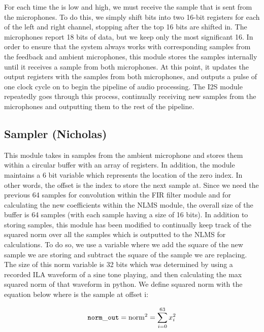 \documentclass{fpgairpods}
\begin{document}
For each time the  is low and high, we must receive the sample that is sent from the microphones. To do this, we simply shift bits into two 16-bit registers for each of the left and right channel, stopping after the top 16 bits are shifted in. The microphones report 18 bits of data, but we keep only the most significant 16. In order to ensure that the system always works with corresponding samples from the feedback and ambient microphones, this module stores the samples internally until it receives a sample from both microphones. At this point, it updates the output registers with the samples from both microphones, and outputs a pulse of one clock cycle on  to begin the pipeline of audio processing. The I2S module repeatedly goes through this process, continually receiving new samples from the microphones and outputting them to the rest of the pipeline.

\subsection{Sampler (Nicholas)}
This module takes in samples from the ambient microphone and stores them within a circular buffer with an array of registers. In addition, the module maintains a 6 bit  variable which represents the location of the zero index. In other words, the offset is the index to store the next sample at. Since we need the previous 64 samples for convolution within the FIR filter module and for calculating the new coefficients within the NLMS module, the overall size of the buffer is 64 samples (with each sample having a size of 16 bits). In addition to storing samples, this module has been modified to continually keep track of the squared norm over all the samples which is outputted to the NLMS for calculations. To do so, we use a  variable where we add the square of the new sample we are storing and subtract the square of the sample we are replacing. The size of this norm variable is 32 bits which was determined by using a recorded ILA waveform of a sine tone playing, and then calculating the max squared norm of that waveform in python. We define squared norm with the equation below where  is the sample at offset i:

$$\ttt{norm_out} = \text{norm}^2 = \sum_{i=0}^{63} x_i^2  $$
\end{document}
